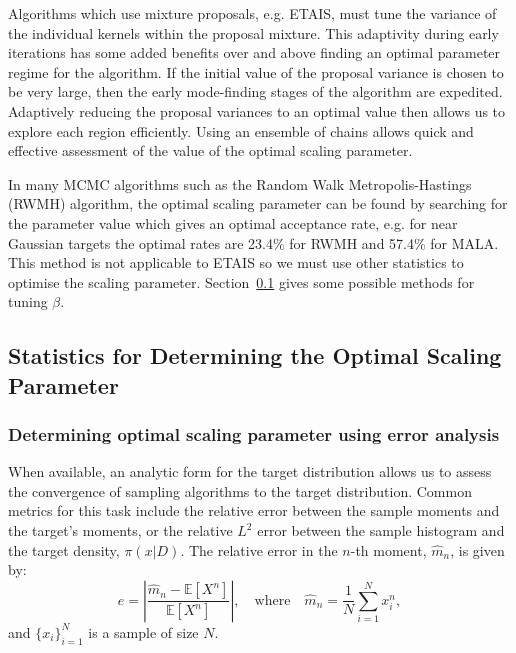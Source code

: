 \documentclass[final]{siamltex}
\begin{document}
Algorithms which use mixture proposals, e.g. ETAIS, must tune the
variance of the individual kernels within the proposal mixture. This
adaptivity during early iterations has some added benefits over and above
finding an optimal parameter regime for the algorithm. If the initial
value of the proposal variance is chosen to be very large, then the early
mode-finding stages of the algorithm are expedited. Adaptively
reducing the proposal variances to an optimal value then allows us to
explore each region efficiently. Using an ensemble of chains allows
quick and effective assessment of the value of the optimal scaling
parameter.

In many MCMC algorithms such as the Random Walk Metropolis-Hastings
(RWMH) algorithm, the optimal scaling parameter can be found by
searching for the parameter value which gives an optimal acceptance
rate, e.g. for near Gaussian targets the optimal rates are 23.4\% for
RWMH and 57.4\% for MALA\cite{roberts2001optimal}. This method
is not applicable to ETAIS so we must use other statistics to optimise
the scaling parameter. Section~\ref{sec:statistics} gives some
possible methods for tuning $\beta$.





\subsection{Statistics for Determining the Optimal Scaling Parameter}\label{sec:statistics}

\subsubsection{Determining optimal scaling parameter using error analysis}

When available, an analytic form for the target distribution allows us
to assess the convergence of sampling algorithms to the target
distribution. Common metrics for this task include the relative error
between the sample moments and the target's moments, or the
relative $L^2$ error between the sample histogram and the target
density, $\pi(x|D)$. The relative error in the $n$-th moment,
$\hat{m}_n$, is given by:
\begin{equation}\label{eq:34567}
	e = \left|\frac{\hat{m}_n - \mathbb{E}[X^n]}{\mathbb{E}[X^n]}\right|, \quad \text{where} \quad \hat{m}_n = \frac{1}{N}\sum_{i=1}^N \! x_i^n,
\end{equation}
and $\{x_i\}_{i=1}^N$ is a sample of size $N$.
\end{document}
